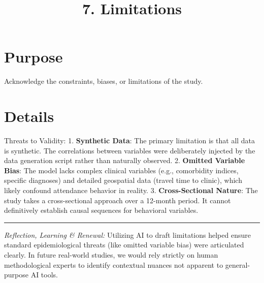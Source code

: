 \documentclass[
]{report}
\title{7. Limitations}
\author{}
\date{}
\renewcommand*\contentsname{Table of contents}
\newcommand\contentsname{Table of contents}
\begin{document}
\maketitle

\renewcommand*\contentsname{Table of contents}
{
\hypersetup{linkcolor=}
\setcounter{tocdepth}{2}
\tableofcontents
}

\chapter{Purpose}\label{purpose}

Acknowledge the constraints, biases, or limitations of the study.

\chapter{Details}\label{details}

Threats to Validity: 1. \textbf{Synthetic Data}: The primary limitation
is that all data is synthetic. The correlations between variables were
deliberately injected by the data generation script rather than
naturally observed. 2. \textbf{Omitted Variable Bias}: The model lacks
complex clinical variables (e.g., comorbidity indices, specific
diagnoses) and detailed geospatial data (travel time to clinic), which
likely confound attendance behavior in reality. 3.
\textbf{Cross-Sectional Nature}: The study takes a cross-sectional
approach over a 12-month period. It cannot definitively establish causal
sequences for behavioral variables.

\begin{center}\rule{0.5\linewidth}{0.5pt}\end{center}

\begin{tcolorbox}[enhanced jigsaw, title=\textcolor{quarto-callout-note-color}{\faInfo}\hspace{0.5em}{AI Capability Checkpoint}, breakable, opacityback=0, opacitybacktitle=0.6, arc=.35mm, bottomtitle=1mm, rightrule=.15mm, colframe=quarto-callout-note-color-frame, toptitle=1mm, left=2mm, colbacktitle=quarto-callout-note-color!10!white, toprule=.15mm, titlerule=0mm, bottomrule=.15mm, leftrule=.75mm, colback=white, coltitle=black]

\emph{Reflection, Learning \& Renewal:} Utilizing AI to draft
limitations helped ensure standard epidemiological threats (like omitted
variable bias) were articulated clearly. In future real-world studies,
we would rely strictly on human methodological experts to identify
contextual nuances not apparent to general-purpose AI tools.

\end{tcolorbox}
\end{document}
